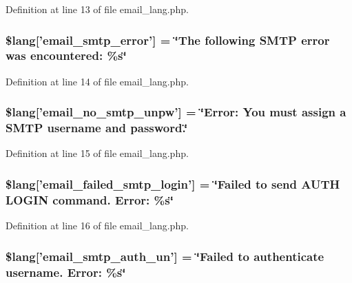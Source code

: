 Definition at line 13 of file email\-\_\-lang.\-php.

\hypertarget{email__lang_8php_a3d70a704117491053ad9c0b4065ecd3f}{
\subsubsection[{\$lang}]{\setlength{\rightskip}{0pt plus 5cm}\$lang\mbox{[}'email\-\_\-smtp\-\_\-error'\mbox{]} = \char`\"{}The following S\-M\-T\-P error was encountered\-: \%s\char`\"{}}}\label{email__lang_8php_a3d70a704117491053ad9c0b4065ecd3f}


Definition at line 14 of file email\-\_\-lang.\-php.

\hypertarget{email__lang_8php_a268c3e96fea16a903e7488f03960e89a}{
\subsubsection[{\$lang}]{\setlength{\rightskip}{0pt plus 5cm}\$lang\mbox{[}'email\-\_\-no\-\_\-smtp\-\_\-unpw'\mbox{]} = \char`\"{}Error\-: You must assign {\bf a} S\-M\-T\-P username {\bf and} password.\char`\"{}}}\label{email__lang_8php_a268c3e96fea16a903e7488f03960e89a}


Definition at line 15 of file email\-\_\-lang.\-php.

\hypertarget{email__lang_8php_a791781c2fd1bd8ec87158be649519621}{
\subsubsection[{\$lang}]{\setlength{\rightskip}{0pt plus 5cm}\$lang\mbox{[}'email\-\_\-failed\-\_\-smtp\-\_\-login'\mbox{]} = \char`\"{}Failed {\bf to} send A\-U\-T\-H L\-O\-G\-I\-N command. Error\-: \%s\char`\"{}}}\label{email__lang_8php_a791781c2fd1bd8ec87158be649519621}


Definition at line 16 of file email\-\_\-lang.\-php.

\hypertarget{email__lang_8php_a69f2fa5072f039936748571ea5cc9cba}{
\subsubsection[{\$lang}]{\setlength{\rightskip}{0pt plus 5cm}\$lang\mbox{[}'email\-\_\-smtp\-\_\-auth\-\_\-un'\mbox{]} = \char`\"{}Failed {\bf to} authenticate username. Error\-: \%s\char`\"{}}}\label{email__lang_8php_a69f2fa5072f039936748571ea5cc9cba}


